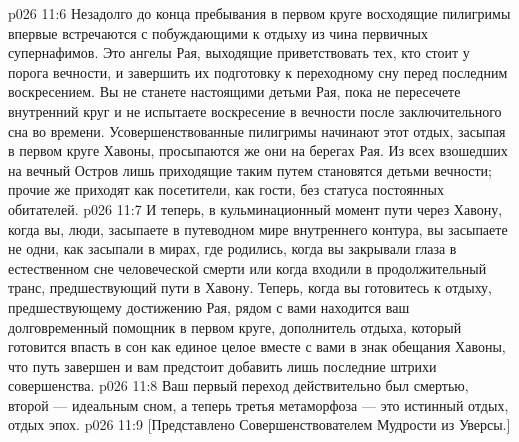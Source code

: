 \vs p026 11:6 \pc Незадолго до конца пребывания в первом круге восходящие пилигримы впервые встречаются с побуждающими к отдыху из чина первичных супернафимов. Это ангелы Рая, выходящие приветствовать тех, кто стоит у порога вечности, и завершить их подготовку к переходному сну перед последним воскресением. Вы не станете настоящими детьми Рая, пока не пересечете внутренний круг и не испытаете воскресение в вечности после заключительного сна во времени. Усовершенствованные пилигримы начинают этот отдых, засыпая в первом круге Хавоны, просыпаются же они на берегах Рая. Из всех взошедших на вечный Остров лишь приходящие таким путем становятся детьми вечности; прочие же приходят как посетители, как гости, без статуса постоянных обитателей.
\vs p026 11:7 И теперь, в кульминационный момент пути через Хавону, когда вы, люди, засыпаете в путеводном мире внутреннего контура, вы засыпаете не одни, как засыпали в мирах, где родились, когда вы закрывали глаза в естественном сне человеческой смерти или когда входили в продолжительный транс, предшествующий пути в Хавону. Теперь, когда вы готовитесь к отдыху, предшествующему достижению Рая, рядом с вами находится ваш долговременный помощник в первом круге, дополнитель отдыха, который готовится впасть в сон как единое целое вместе с вами в знак обещания Хавоны, что путь завершен и вам предстоит добавить лишь последние штрихи совершенства.
\vs p026 11:8 Ваш первый переход действительно был смертью, второй --- идеальным сном, а теперь третья метаморфоза --- это истинный отдых, отдых эпох.
\vsetoff
\vs p026 11:9 [Представлено Совершенствователем Мудрости из Уверсы.]
